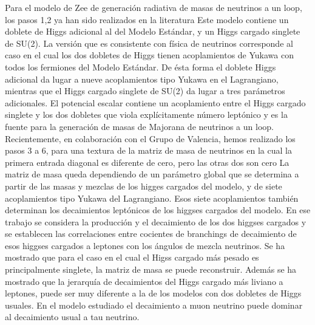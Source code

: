 Para el modelo de Zee de generación radiativa de masas de neutrinos a
un loop, los pasos 1,2 ya han sido realizados en la literatura
Este modelo contiene un doblete de Higgs
adicional al del Modelo Estándar, y un Higgs cargado singlete de
SU(2). La versión que es consistente con física de neutrinos
corresponde al caso en el cual los dos dobletes de Higgs tienen
acoplamientos de Yukawa con todos los fermiones del Modelo Estándar.
De ésta forma el doblete Higgs adicional da lugar a nueve
acoplamientos tipo Yukawa en el Lagrangiano, mientras que el Higgs
cargado singlete de SU(2) da lugar a tres parámetros adicionales. El
potencial escalar contiene un acoplamiento entre el Higgs cargado
singlete y los dos dobletes que viola explícitamente número leptónico
y es la fuente para la generación de masas de Majorana de neutrinos a
un loop. Recientemente, en colaboración con el Grupo de Valencia,
hemos realizado los pasos 3 a 6, para una textura de la matriz de masa
de neutrinos en la cual la primera entrada diagonal es diferente de
cero, pero las otras dos son cero %
La
matriz de masa queda dependiendo de un parámetro global que se
determina a partir de las masas y mezclas de los higges cargados del
modelo, y de siete acoplamientos tipo Yukawa del Lagrangiano. Esos
siete acoplamientos también determinan los decaimientos leptónicos de
los higgses cargados del modelo. En ese trabajo se considera la
producción y el decaimiento de los dos higgses cargados y se
establecen las correlaciones entre cocientes de branchings de
decaimiento de esos higgses cargados a leptones con los ángulos de
mezcla neutrinos. Se ha mostrado que para el caso en el cual el Higss
cargado más pesado es principalmente singlete, la matriz de masa se
puede reconstruir. Además se ha mostrado que la jerarquía de
decaimientos del Higgs cargado más liviano a leptones, puede ser muy
diferente a la de los modelos con dos dobletes de Higgs usuales.  En
el modelo estudiado el decaimiento a muon neutrino puede dominar al
decaimiento usual a tau neutrino.


